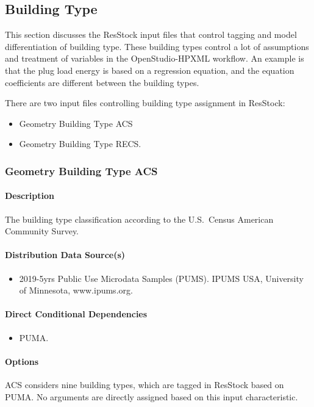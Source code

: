 \subsection{Building Type}
This section discusses the ResStock input files that control tagging and model differentiation of building type.  These building types control a lot of assumptions and treatment of variables in the OpenStudio-HPXML workflow. An example is that the plug load energy is based on a regression equation, and the equation coefficients are different between the building types.

There are two input files controlling building type assignment in ResStock:

\begin{itemize}
    \item Geometry Building Type ACS
    \item Geometry Building Type RECS.
\end{itemize}

\subsubsection{Geometry Building Type ACS}
\paragraph{Description}
The building type classification according to the U.S.~Census American Community Survey.

\paragraph{Distribution Data Source(s)}
\begin{itemize}
    \item 2019-5yrs Public Use Microdata Samples (PUMS). IPUMS USA, University of Minnesota, www.ipums.org.
\end{itemize}

\paragraph{Direct Conditional Dependencies}
\begin{itemize}
    \item PUMA.
\end{itemize}
\paragraph{Options}
ACS considers nine building types, which are tagged in ResStock based on PUMA. No arguments are directly assigned based on this input characteristic.

